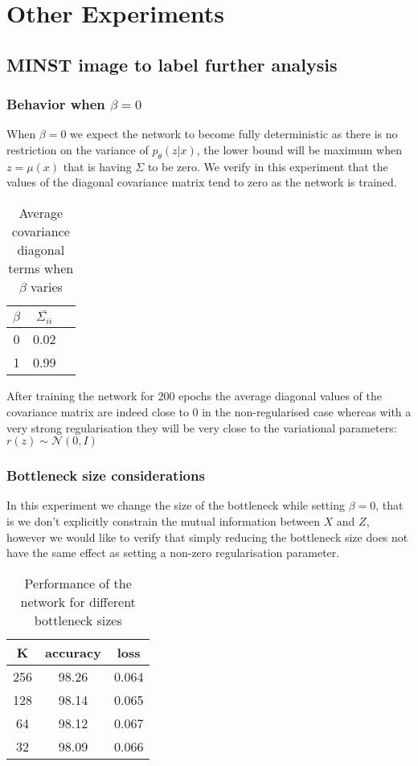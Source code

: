 \documentclass[11pt,oneside,openright]{report}
\begin{document}
\chapter{Other Experiments}
\section{MINST image to label further analysis}
\subsection{Behavior when $\beta = 0$}
When $\beta = 0$ we expect the network to become fully deterministic as there is no restriction on the variance of $p_\theta(z|x)$, the lower bound will be maximum when $z = \mu(x)$  that is having $\Sigma$ to be zero. We verify in this experiment that the values of the diagonal covariance matrix tend to zero as the network is trained.

\begin {table}[H]
\begin{center}
\begin{tabular}{ c | c c }
 $\beta$ & $\bar{\Sigma_{ii}}$ \\
 \hline
0 & 0.02\\
1 & 0.99 \\
\end{tabular}
\end{center}
\caption{Average covariance diagonal terms when $\beta$ varies}
\end {table}

After training the network for 200 epochs the average diagonal values of the covariance matrix are indeed close to 0 in the non-regularised case whereas with a very strong regularisation they will be very close to the variational parameters: $r(z) \sim \mathcal{N}(0, I)$

\subsection{Bottleneck size considerations}
In this experiment we change the size of the bottleneck while setting $\beta = 0$, that is we don't explicitly constrain the mutual information between $X$ and $Z$, however we would like to verify that simply reducing the bottleneck size does not have the same effect as setting a non-zero regularisation parameter.

\begin {table}[H]
\begin{center}
\begin{tabular}{ c | c c }
 K & accuracy & loss \\
 \hline
256 & 98.26 & 0.064 \\
128 & 98.14 & 0.065 \\
64 & 98.12& 0.067 \\
32 & 98.09 & 0.066 \\
\end{tabular}
\end{center}
\caption{Performance of the network for different bottleneck sizes}
\end {table}
\end{document}
